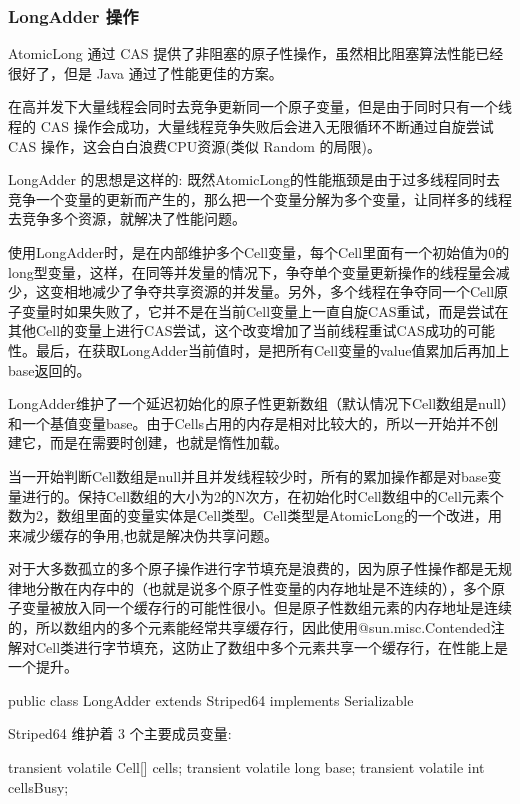 \subsubsection{LongAdder 操作}

AtomicLong 通过 CAS 提供了非阻塞的原子性操作，虽然相比阻塞算法性能已经很好了，但是 Java 通过了性能更佳的方案。

在高并发下大量线程会同时去竞争更新同一个原子变量，但是由于同时只有一个线程的 CAS 操作会成功，大量线程竞争失败后会进入无限循环不断通过自旋尝试 CAS 操作，这会白白浪费CPU资源(类似 Random 的局限)。

LongAdder 的思想是这样的: 既然AtomicLong的性能瓶颈是由于过多线程同时去竞争一个变量的更新而产生的，那么把一个变量分解为多个变量，让同样多的线程去竞争多个资源，就解决了性能问题。

使用LongAdder时，是在内部维护多个Cell变量，每个Cell里面有一个初始值为0的long型变量，这样，在同等并发量的情况下，争夺单个变量更新操作的线程量会减少，这变相地减少了争夺共享资源的并发量。另外，多个线程在争夺同一个Cell原子变量时如果失败了，它并不是在当前Cell变量上一直自旋CAS重试，而是尝试在其他Cell的变量上进行CAS尝试，这个改变增加了当前线程重试CAS成功的可能性。最后，在获取LongAdder当前值时，是把所有Cell变量的value值累加后再加上base返回的。

LongAdder维护了一个延迟初始化的原子性更新数组（默认情况下Cell数组是null）和一个基值变量base。由于Cells占用的内存是相对比较大的，所以一开始并不创建它，而是在需要时创建，也就是惰性加载。

当一开始判断Cell数组是null并且并发线程较少时，所有的累加操作都是对base变量进行的。保持Cell数组的大小为2的N次方，在初始化时Cell数组中的Cell元素个数为2，数组里面的变量实体是Cell类型。Cell类型是AtomicLong的一个改进，用来减少缓存的争用,也就是解决伪共享问题。

对于大多数孤立的多个原子操作进行字节填充是浪费的，因为原子性操作都是无规律地分散在内存中的（也就是说多个原子性变量的内存地址是不连续的），多个原子变量被放入同一个缓存行的可能性很小。但是原子性数组元素的内存地址是连续的，所以数组内的多个元素能经常共享缓存行，因此使用@sun.misc.Contended注解对Cell类进行字节填充，这防止了数组中多个元素共享一个缓存行，在性能上是一个提升。

\begin{Java}
public class LongAdder extends Striped64 implements Serializable
\end{Java}

Striped64 维护着 3 个主要成员变量:

\begin{Java}
transient volatile Cell[] cells;
transient volatile long base;
transient volatile int cellsBusy;
\end{Java}

